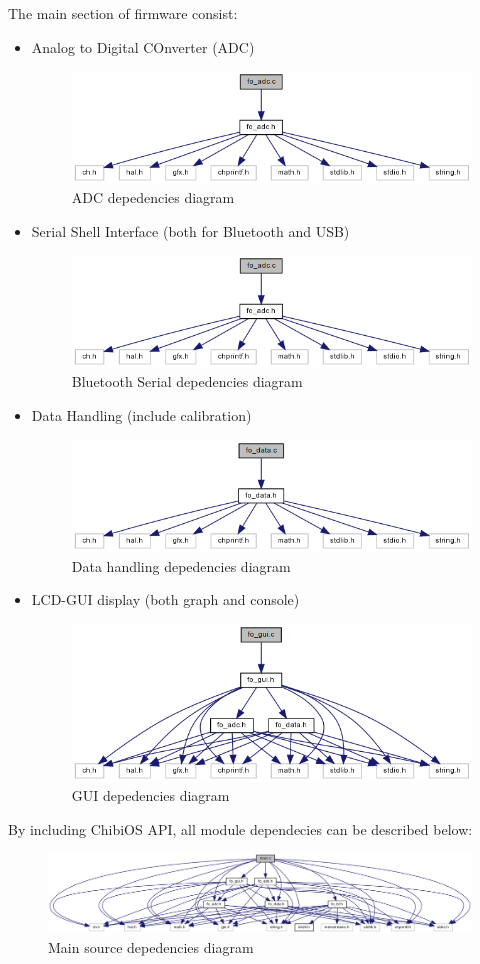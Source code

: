 \documentclass[12pt,]{book}
\begin{document}
	The main section of firmware consist:
	\begin{itemize}
		\item Analog to Digital COnverter (ADC)
		\begin{figure}[H]
			\centering
			\includegraphics[width=0.5\linewidth]{images/jw_ch_adc}
			\caption{ADC depedencies diagram}
		\end{figure}
	
		\item Serial Shell Interface (both for Bluetooth and USB)
		\begin{figure}[H]
			\centering
			\includegraphics[width=0.5\linewidth]{images/jw_ch_adc}
			\caption{Bluetooth Serial depedencies diagram}
		\end{figure}
		\item Data Handling (include calibration)
		\begin{figure}[H]
			\centering
			\includegraphics[width=0.5\linewidth]{images/jw_ch_data}
			\caption{Data handling depedencies diagram}
		\end{figure}
		\item LCD-GUI display (both graph and console)
		\begin{figure}[H]
			\centering
			\includegraphics[width=0.5\linewidth]{images/jw_ch_gui}
			\caption{GUI depedencies diagram}
		\end{figure}		
	\end{itemize}

	By including ChibiOS API, all module dependecies can be described below:
	\begin{figure}[H]
		\centering
		\includegraphics[width=\linewidth]{images/jw_ch_main}
		\caption{Main source depedencies diagram}
	\end{figure}
	
\end{document}
